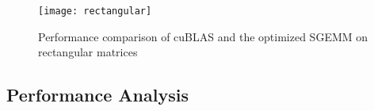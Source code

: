 

\begin{figure*}[htbp]
\begin{center}
\texttt{[image: rectangular]}
\caption{\small Performance comparison of cuBLAS and the optimized SGEMM on rectangular matrices}
\label{fig:rect}
\end{center}
\end{figure*}


\subsection{Performance Analysis}

